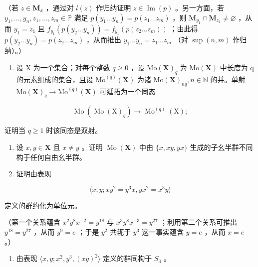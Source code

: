 （若 \(z \in \mathbf{M}_x\) ，通过对 \(l(z)\) 作归纳证明 \(z \in \operatorname{Im}(p)\) 。另一方面，若 \(y_1, \ldots, y_n, z_1, \ldots, z_m \in \mathbb{P}\) 满足 \(p(y_1 \ldots y_n) = p(z_1 \ldots z_m)\) ，则 \(\mathbf{M}_{y_1} \cap \mathbf{M}_{z_1} \neq \varnothing\) ，从而 \(y_1 = z_1\) 且 \(f_{y_1}(p(y_2 \ldots y_n)) = f_{y_1}(p(z_2 \ldots z_m))\) ；由此得 \(p(y_2 \ldots y_n) = p(z_2 \ldots z_m)\) ，从而推出 \(y_1 \ldots y_n = z_1 \ldots z_m\) （对 \(\sup(n, m)\) 作归纳）。）

\begin{enumerate}
\def\labelenumi{\arabic{enumi}.}
\setcounter{enumi}{7}
\tightlist
\item
  设 X 为一个集合；对每个整数 \(q \geqslant 0\) ，设 \(\mathrm{Mo}(\mathbf{X})_{q}\) 为 \(\mathrm{Mo}(\mathbf{X})\) 中长度为 q 的元素组成的集合，且设 \(\mathrm{Mo}^{(q)}(\mathbf{X})\) 为诸 \(\mathrm{Mo}(\mathbf{X})_{nq}, n \in \mathbb{N}\) 的并。单射 \(\mathrm{Mo}(\mathbf{X})_{q} \to \mathrm{Mo}^{(q)}(\mathbf{X})\) 可延拓为一个同态
\end{enumerate}

\[
\operatorname{Mo} (\operatorname{Mo} (\mathrm{X}) _ {q}) \rightarrow \operatorname{Mo} ^ {(q)} (\mathrm{X});
\]

证明当 \(q \geqslant 1\) 时该同态是双射。

\begin{enumerate}
\def\labelenumi{\arabic{enumi}.}
\setcounter{enumi}{8}
\item
  设 \(x, y \in \mathbf{X}\) 且 \(x \neq y\) 。证明 \(\operatorname{Mo}(\mathbf{X})\) 中由 \(\{x, xy, yx\}\) 生成的子幺半群不同构于任何自由幺半群。
\item
  证明由表现
\end{enumerate}

\[
\langle x, y; x y ^ {2} = y ^ {3} x, y x ^ {2} = x ^ {3} y \rangle
\]

定义的群约化为单位元。

（第一个关系蕴含 \(x^{2}y^{8}x^{-2} = y^{18}\) 与 \(x^{3}y^{8}x^{-3} = y^{27}\) ；利用第二个关系可推出 \(y^{18} = y^{27}\) ，从而 \(y^{9} = e\) ；于是 \(y^{2}\) 共轭于 \(y^{3}\) 这一事实蕴含 \(y = e\) ，从而 \(x = e\) 。）

\begin{enumerate}
\def\labelenumi{\arabic{enumi}.}
\setcounter{enumi}{10}
\tightlist
\item
  由表现 \(\langle x,y;x^{2},y^{3},(xy)^{2}\rangle\) 定义的群同构于 \(S_{3}\) 。
\end{enumerate}


